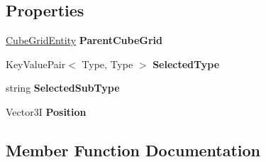 \subsection*{Properties}
\begin{DoxyCompactItemize}
\item 
\hypertarget{class_s_e_server_extender_1_1_cube_block_dialog_ab8635424a8a62770c94e07ceead6e021}{}\hyperlink{class_s_e_mod_a_p_i_internal_1_1_a_p_i_1_1_entity_1_1_sector_1_1_sector_object_1_1_cube_grid_entity}{Cube\+Grid\+Entity} {\bfseries Parent\+Cube\+Grid}\label{class_s_e_server_extender_1_1_cube_block_dialog_ab8635424a8a62770c94e07ceead6e021}

\item 
\hypertarget{class_s_e_server_extender_1_1_cube_block_dialog_a31bc07b08a19b9862ac6902dd3b17c7b}{}Key\+Value\+Pair$<$ Type, Type $>$ {\bfseries Selected\+Type}\label{class_s_e_server_extender_1_1_cube_block_dialog_a31bc07b08a19b9862ac6902dd3b17c7b}

\item 
\hypertarget{class_s_e_server_extender_1_1_cube_block_dialog_a60413101de90c51ea2ef974c1a0cedc3}{}string {\bfseries Selected\+Sub\+Type}\label{class_s_e_server_extender_1_1_cube_block_dialog_a60413101de90c51ea2ef974c1a0cedc3}

\item 
\hypertarget{class_s_e_server_extender_1_1_cube_block_dialog_a3e0e9b21b628073c21ac9d172ce4f419}{}Vector3\+I {\bfseries Position}\label{class_s_e_server_extender_1_1_cube_block_dialog_a3e0e9b21b628073c21ac9d172ce4f419}

\end{DoxyCompactItemize}


\subsection{Member Function Documentation}
\hypertarget{class_s_e_server_extender_1_1_cube_block_dialog_a1e343d4e879fb6c3d1a53f8b4f1edb9a}{}
